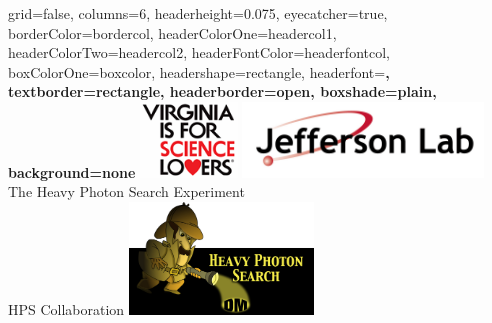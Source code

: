 




	\color{standardfontcolor}

	\begin{poster}{
		grid=false,
		columns=6,
		headerheight=0.075\textheight,
		eyecatcher=true,
		borderColor=bordercol,
		headerColorOne=headercol1,
		headerColorTwo=headercol2,
		headerFontColor=headerfontcol,
		boxColorOne=boxcolor,
		headershape=rectangle,
		headerfont=\sffamily\bfseries\Large,
		textborder=rectangle,
		headerborder=open,
		boxshade=plain,
		background=none
	}
	{
		\includegraphics[height=2cm]{figs/logo/VirginiaScienceLover.png}\hspace{0.3cm}\vspace{-3cm}
		\includegraphics[height=2cm]{figs/logo/jlab_logo}
	}
	{
		\textsf %
		{The Heavy Photon Search Experiment}
	}
	{
		\sf\vspace{0.5em}\\
		HPS Collaboration
	}
	{
		\hspace{2cm}
		\includegraphics[height=3cm]{figs/logo/heavy_photon_logo.jpg}
	}


\end{poster}
